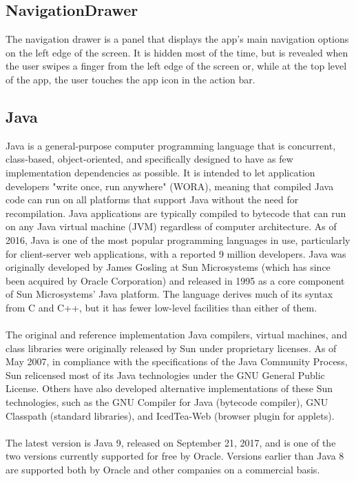 \documentclass[a4paper, 12pt]{report}
\begin{document}
\subsection{NavigationDrawer}
\hspace{0.8cm}The navigation drawer is a panel that displays the app’s main navigation options on the left edge of the screen. It is hidden most of the time, but is revealed when the user swipes a finger from the left edge of the screen or, while at the top level of the app, the user touches the app icon in the action bar.
\subsection{Java}
\hspace*{0.8cm}Java is a general-purpose computer programming language that is concurrent, class-based, object-oriented, and specifically designed to have as few implementation dependencies as possible. It is intended to let application developers "write once, run anywhere" (WORA), meaning that compiled Java code can run on all platforms that support Java without the need for recompilation. Java applications are typically compiled to bytecode that can run on any Java virtual machine (JVM) regardless of computer architecture. As of 2016, Java is one of the most popular programming languages in use, particularly for client-server web applications, with a reported 9 million developers. Java was originally developed by James Gosling at Sun Microsystems (which has since been acquired by Oracle Corporation) and released in 1995 as a core component of Sun Microsystems' Java platform. The language derives much of its syntax from C and C++, but it has fewer low-level facilities than either of them.\\\\
\hspace*{0.8cm}
The original and reference implementation Java compilers, virtual machines, and class libraries were originally released by Sun under proprietary licenses. As of May 2007, in compliance with the specifications of the Java Community Process, Sun relicensed most of its Java technologies under the GNU General Public License. Others have also developed alternative implementations of these Sun technologies, such as the GNU Compiler for Java (bytecode compiler), GNU Classpath (standard libraries), and IcedTea-Web (browser plugin for applets).\\\\
\hspace*{0.8cm}
The latest version is Java 9, released on September 21, 2017, and is one of the two versions currently supported for free by Oracle. Versions earlier than Java 8 are supported both by Oracle and other companies on a commercial basis.
\end{document}
